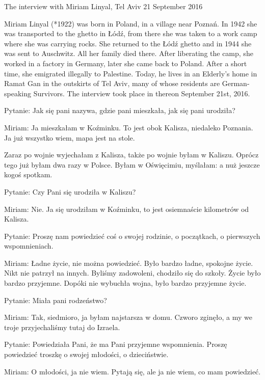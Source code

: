 The interview with Miriam Linyal, Tel Aviv 21 September 2016 

 Miriam Linyal (*1922) was born in Poland, in a village near Poznań. In 1942 she was transported to the ghetto in Łódź, from there she was taken to a work camp where she was carrying rocks. She returned to the Łódź ghetto and in 1944 she was sent to Auschwitz. All her family died there. After liberating the camp, she worked in a factory in Germany, later she came back to Poland. After a short time, she emigrated illegally to Palestine. Today, he lives in an Elderly’s home in Ramat Gan in the outskirts of Tel Aviv, many of whose residents are German-speaking Survivors. The interview took place in thereon September 21st, 2016. 

Pytanie: Jak się pani nazywa, gdzie pani mieszkała, jak się pani urodziła? 

Miriam: Ja mieszkałam w Koźminku. To jest obok Kalisza, niedaleko Poznania. Ja już wszystko wiem, mapa jest na stole.  

Zaraz po wojnie wyjechałam z Kalisza, także po wojnie byłam w Kaliszu. Oprócz tego już byłam dwa razy w Polsce. Byłam w Oświęcimiu, myślałam: a nuż jeszcze kogoś spotkam. 

 

Pytanie: Czy Pani się urodziła w Kaliszu? 

Miriam: Nie. Ja się urodziłam w Koźminku, to jest osiemnaście kilometrów od Kalisza. 

 

Pytanie: Proszę nam powiedzieć coś o swojej rodzinie, o początkach, o pierwszych wspomnieniach. 

Miriam: Ładne życie, nie można powiedzieć. Było bardzo ładne, spokojne życie. Nikt nie patrzył na innych. Byliśmy zadowoleni, chodziło się do szkoły. Życie było bardzo przyjemne. Dopóki nie wybuchła wojna, było bardzo przyjemne życie. 

 

Pytanie: Miała pani rodzeństwo? 

Miriam: Tak, siedmioro, ja byłam najstarsza w domu. Czworo zginęło, a my we troje przyjechaliśmy tutaj do Izraela. 

 

Pytanie: Powiedziała Pani, że ma Pani przyjemne wspomnienia. Proszę powiedzieć troszkę o swojej młodości, o dzieciństwie. 

Miriam: O młodości, ja nie wiem. Pytają się, ale ja nie wiem, co mam powiedzieć. 

 

